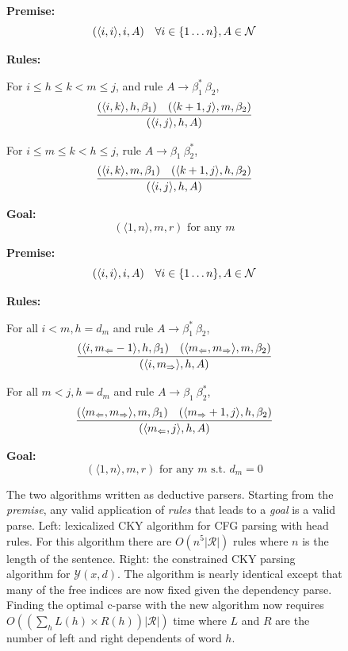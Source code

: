 \documentclass[11pt,letterpaper]{article}
\newcommand{\rules}{\mathcal{R}}
\newcommand{\Left}[1]{#1_{\Leftarrow}}
\newcommand{\Right}[1]{#1_{\Rightarrow}}
\newcommand{\Span}[1]{\langle #1 \rangle}
\newcommand{\tri}{\langle \Left{m}, \Right{m} \rangle}
\newcommand{\Root}{r}
\newcommand{\RuleA}[3]{#1 \rightarrow #2^*\ #3}
\newcommand{\RuleB}[3]{#1 \rightarrow #2\ #3^*}
\begin{document}
\begin{figure}
  \small 
  \begin{multicols}{2}
  \noindent \textbf{Premise:}
  \[(\Span{i, i}, i, A)\ \ \ \forall i \in \{1 \ldots n\}, A \in {\cal N}\]

  \noindent\textbf{Rules:}

   For $i\leq h \leq k < m \leq j$,  and  rule  $\RuleA{A}{\beta_1}{\beta_2}$,
   \[\infer{( \Span{i, j},  h,  A)}{( \Span{i, k}, h, \beta_1)  &  ( \Span{k+1, j}, m, \beta_2) } \]

   For $i\leq m \leq k < h \leq j$, rule  $\RuleB{A}{\beta_1}{\beta_2}$,
   \[\infer{(\Span{i, j},  h, A)}{(\Span{i, k}, m, \beta_1)  &  (\Span{k+1, j}, h, \beta_2) }  \]

\noindent \textbf{Goal:}
\[ (\Span{1, n}, m, \Root) \mbox{\ for\ any } m\]

\label{fig:cky}

  \noindent \textbf{Premise:}
  \[(\langle i,i \rangle, i, A)\ \ \ \forall i \in \{1 \ldots n\}, A \in {\cal N}\]

  \noindent\textbf{Rules:}

  For all   $i < m, h = d_m$  and rule  $\RuleA{A}{\beta_1}{\beta_2}$,
  \[\infer{( \Span{i, \Right{m}}, h, A)}{(\Span{i, \Left{m}-1}, h, \beta_1)  &  (\tri, m, \beta_2) } \]

  For all    $m < j, h = d_m$ and  rule  $\RuleB{A}{\beta_1}{\beta_2}$,
  \[ \infer{( \Span{ \Left{m}, j }, h, A)}{(\tri, m, \beta_1)  &  (\Span{\Right{m}+ 1, j}, h, \beta_2) } \]

\noindent \textbf{Goal:}
\[(\Span{1, n}, m, \Root) \mbox{\ for\ any } m \mbox{\ s.t.\ } d_m = 0 \]

\end{multicols}
\caption{The two algorithms written as deductive parsers. Starting
  from the \textit{premise}, any valid application of \textit{rules}
  that leads to a \textit{goal} is a valid parse.  Left: lexicalized CKY
  algorithm for CFG parsing with head rules. For this algorithm there
  are $O(n^5|\rules|)$ rules where $n$ is the length of the
  sentence. Right: the constrained CKY parsing algorithm for
  $\mathcal{Y}(x, d)$. The algorithm is nearly identical except that
  many of the free indices are now fixed given  the dependency
  parse. Finding the optimal c-parse with the new algorithm now requires  $O\left((\sum_{h} L(h) \times R(h)) |\rules|\right)$ time where $L$ and $R$ are the 
  number of left and right dependents of word $h$. \label{fig:cky_new}
}
\end{figure}
\end{document}
